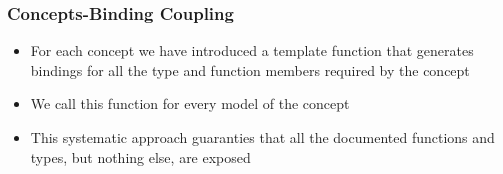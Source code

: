 \begin{frame}
  \frametitle{Concepts-Binding Coupling}
  \begin{itemize}
  \item For each concept we have introduced a template function that generates
    bindings for all the type and function members required by the concept
  \item We call this function for every model of the concept
  \item This systematic approach guaranties that all the documented functions
    and types, but nothing else, are exposed
  \end{itemize}
\end{frame}
